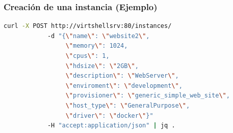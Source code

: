 \documentclass[xcolor=dvipsnames,table]{beamer} %
\begin{document}

\begin{frame}[fragile]
	\frametitle{Creación de una instancia (Ejemplo)}
	\begin{lstlisting}[language=Bash,basicstyle=\ttfamily\scriptsize,keywordstyle=\color{blue}]
		curl -X POST http://virtshellsrv:80/instances/ 
		    -d "{\"name\": \"website2\", 
		         \"memory\": 1024, 
		         \"cpus\": 1, 
		         \"hdsize\": \"2GB\", 
		         \"description\": \"WebServer\", 
		         \"enviroment\": \"development\", 
		         \"provisioner\": \"generic_simple_web_site\", 
		         \"host_type\": \"GeneralPurpose\", 
		         \"driver\": \"docker\"}" 
		    -H "accept:application/json" | jq .
	\end{lstlisting}
\end{frame}

\end{document}
